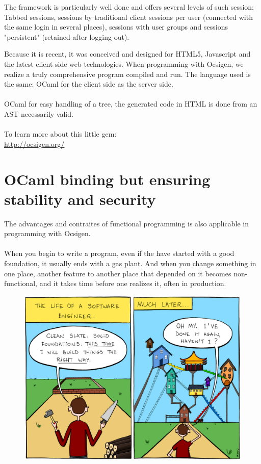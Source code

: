 \documentclass {life-en}
\begin{document}
The framework is particularly well done and offers several levels of such session: Tabbed sessions, sessions by traditional client sessions per user (connected with the same login in several places), sessions with user groups and sessions "persistent" (retained after logging out).\\

\newpage

Because it is recent, it was conceived and designed for HTML5, Javascript and the latest client-side web technologies. When programming with Ocsigen, we realize a truly comprehensive program compiled and run. The language used is the same: OCaml for the client side as the server side.\\
\\
OCaml for easy handling of a tree, the generated code in HTML is done from an AST necessarily valid.\\
\\
To learn more about this little gem: \\
\url{http://ocsigen.org/}

\section{OCaml binding but ensuring stability and security}

The advantages and contraites of functional programming is also applicable in programming with Ocsigen.\\
\\
When you begin to write a program, even if the have started with a good foundation, it usually ends with a gas plant. And when you change something in one place, another feature to another place that depended on it becomes non-functional, and it takes time before one realizes it, often in production.\\

\begin{figure} [H]
  \begin{center}
    \includegraphics [width = 13cm]{img/proj.png}
  \end{center}
\end{figure}
\end{document}
